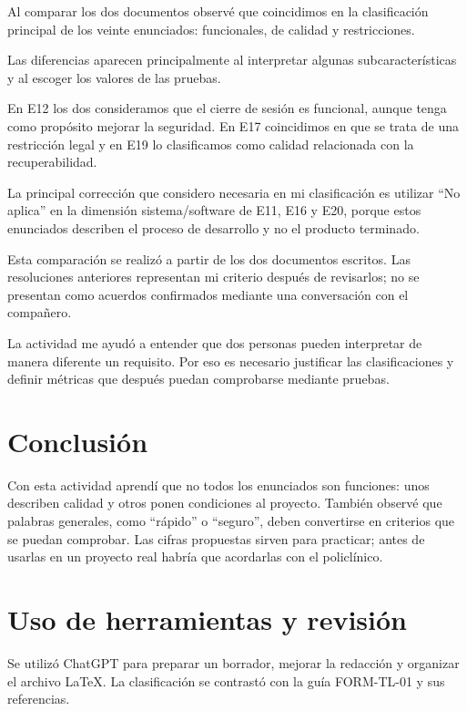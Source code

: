 \documentclass[conference,onecolumn]{IEEEtran}
\begin{document}
Al comparar los dos documentos observé que coincidimos
en la clasificación principal de los veinte enunciados:
funcionales, de calidad y restricciones.

Las diferencias aparecen principalmente al interpretar
algunas subcaracterísticas y al escoger los valores
de las pruebas.

En E12 los dos consideramos que el cierre de sesión
es funcional, aunque tenga como propósito mejorar
la seguridad. En E17 coincidimos en que se trata
de una restricción legal y en E19 lo clasificamos
como calidad relacionada con la recuperabilidad.

La principal corrección que considero necesaria
en mi clasificación es utilizar ``No aplica'' en
la dimensión sistema/software de E11, E16 y E20,
porque estos enunciados describen el proceso de
desarrollo y no el producto terminado.

Esta comparación se realizó a partir de los dos
documentos escritos. Las resoluciones anteriores
representan mi criterio después de revisarlos;
no se presentan como acuerdos confirmados
mediante una conversación con el compañero.

La actividad me ayudó a entender que dos personas
pueden interpretar de manera diferente un requisito.
Por eso es necesario justificar las clasificaciones
y definir métricas que después puedan comprobarse
mediante pruebas.


\section{Conclusión}
Con esta actividad aprendí que no todos los enunciados son funciones: unos describen calidad y otros ponen condiciones al proyecto. También observé que palabras generales, como \enquote{rápido} o \enquote{seguro}, deben convertirse en criterios que se puedan comprobar. Las cifras propuestas sirven para practicar; antes de usarlas en un proyecto real habría que acordarlas con el policlínico.

\section*{Uso de herramientas y revisión}
Se utilizó ChatGPT para preparar un borrador, mejorar la redacción y organizar el archivo LaTeX. La clasificación se contrastó con la guía FORM-TL-01 y sus referencias. 

\printbibliography[title={Referencias}]
\end{document}
